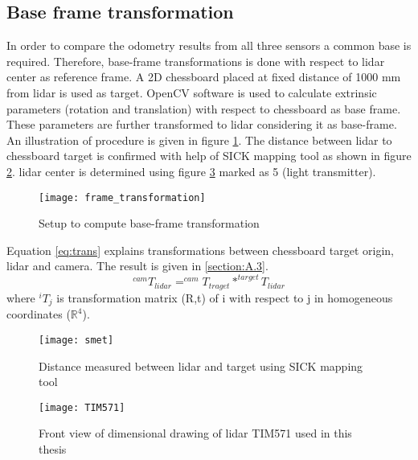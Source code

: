 \subsection{Base frame transformation}
In order to compare the odometry results from all three sensors a common base is required. Therefore, base-frame transformations is done with respect to \acrshort{lidar} center as reference frame. A 2D chessboard placed at fixed distance of 1000 mm from \acrshort{lidar} is used as target. OpenCV software \cite{opencvcalib} is used to calculate extrinsic parameters (rotation and translation) with respect to chessboard as base frame. These parameters are further transformed to \acrshort{lidar} considering it as base-frame. An illustration of procedure is given in figure \ref{fig:transformation}. The distance between \acrshort{lidar} to chessboard target is confirmed with help of SICK mapping tool as shown in figure \ref{fig:smet}. \acrshort{lidar} center is determined using figure \ref{fig:tim} marked as 5 (light transmitter). \\
\begin{figure}[H]
	\centering
	\texttt{[image: frame\_transformation]}
	\caption{Setup to compute base-frame transformation}
	\label{fig:transformation}
\end{figure}
\noindent Equation \ref{eq:trans} explains transformations between chessboard target origin, \acrshort{lidar} and camera. The result is given in \ref{section:A.3}.\\
\begin{equation*}
\label{eq:trans}
^{cam}T_{lidar}  = ^{cam}T_{traget} * ^{target}T_{lidar} 
\end{equation*} 
\noindent where $ ^{i}T_{j} $ is transformation matrix (R,t) of i with respect to j in homogeneous coordinates ($ \mathbb{R}^{4} $).
\begin{figure}[H]
	\centering
	\texttt{[image: smet]}
	\caption{Distance measured between \acrshort{lidar} and target using SICK mapping tool}
	\label{fig:smet}
\end{figure}
\begin{figure}[H]
	\centering
	\texttt{[image: TIM571]}
	\caption{Front view of dimensional drawing of \acrshort{lidar} TIM571 used in this thesis \cite{sick}}
	\label{fig:tim}
\end{figure}


